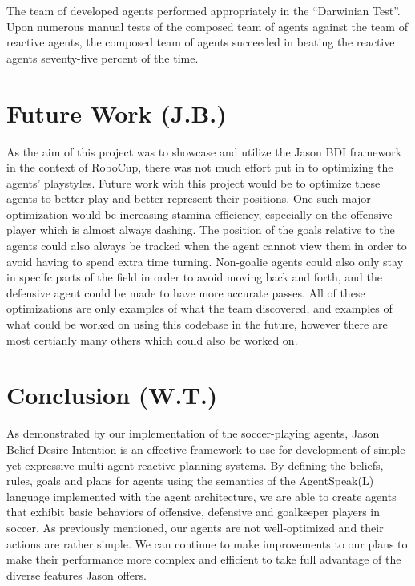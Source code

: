 \documentclass[conference]{IEEEtran}
\begin{document}
The team of developed agents performed appropriately in the ``Darwinian Test''.
Upon numerous manual tests of the composed team of agents against the team of reactive agents, the composed team of agents succeeded in beating the reactive agents seventy-five percent of the time.


\section{Future Work (J.B.)}
As the aim of this project was to showcase and utilize the Jason BDI framework in the context of RoboCup, there was not much effort put in to optimizing the agents' playstyles.
Future work with this project would be to optimize these agents to better play and better represent their positions.
One such major optimization would be increasing stamina efficiency, especially on the offensive player which is almost always dashing.
The position of the goals relative to the agents could also always be tracked when the agent cannot view them in order to avoid having to spend extra time turning.
Non-goalie agents could also only stay in specifc parts of the field in order to avoid moving back and forth, and the defensive agent could be made to have more accurate passes.
All of these optimizations are only examples of what the team discovered, and examples of what could be worked on using this codebase in the future, however there are most certianly many others which could also be worked on.

\section{Conclusion (W.T.)}
As demonstrated by our implementation of the soccer-playing agents, Jason Belief-Desire-Intention is an effective framework to use for development of simple yet expressive multi-agent reactive planning systems.
By defining the beliefs, rules, goals and plans for agents using the semantics of the AgentSpeak(L) language implemented with the agent architecture, we are able to create agents that exhibit basic behaviors of offensive, defensive and goalkeeper players in soccer.
As previously mentioned, our agents are not well-optimized and their actions are rather simple.
We can continue to make improvements to our plans to make their performance more complex and efficient to take full advantage of the diverse features Jason offers.
\end{document}
